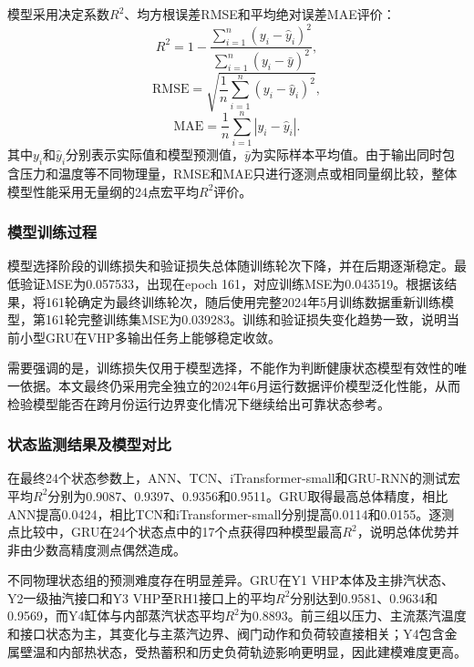 模型采用决定系数$R^2$、均方根误差RMSE和平均绝对误差MAE评价：
\begin{equation}
R^2=1-\frac{\sum_{i=1}^{n}(y_i-\hat y_i)^2}{\sum_{i=1}^{n}(y_i-\bar y)^2},
\end{equation}
\begin{equation}
\mathrm{RMSE}=\sqrt{\frac{1}{n}\sum_{i=1}^{n}(y_i-\hat y_i)^2},
\end{equation}
\begin{equation}
\mathrm{MAE}=\frac{1}{n}\sum_{i=1}^{n}|y_i-\hat y_i|.
\end{equation}
其中$y_i$和$\hat y_i$分别表示实际值和模型预测值，$\bar y$为实际样本平均值。由于输出同时包含压力和温度等不同物理量，RMSE和MAE只进行逐测点或相同量纲比较，整体模型性能采用无量纲的24点宏平均$R^2$评价。

\subsubsection{模型训练过程}

模型选择阶段的训练损失和验证损失总体随训练轮次下降，并在后期逐渐稳定。最低验证MSE为0.057533，出现在epoch 161，对应训练MSE为0.043519。根据该结果，将161轮确定为最终训练轮次，随后使用完整2024年5月训练数据重新训练模型，第161轮完整训练集MSE为0.039283。训练和验证损失变化趋势一致，说明当前小型GRU在VHP多输出任务上能够稳定收敛。

需要强调的是，训练损失仅用于模型选择，不能作为判断健康状态模型有效性的唯一依据。本文最终仍采用完全独立的2024年6月运行数据评价模型泛化性能，从而检验模型能否在跨月份运行边界变化情况下继续给出可靠状态参考。

\subsubsection{状态监测结果及模型对比}

在最终24个状态参数上，ANN、TCN、iTransformer-small和GRU-RNN的测试宏平均$R^2$分别为0.9087、0.9397、0.9356和0.9511。GRU取得最高总体精度，相比ANN提高0.0424，相比TCN和iTransformer-small分别提高0.0114和0.0155。逐测点比较中，GRU在24个状态点中的17个点获得四种模型最高$R^2$，说明总体优势并非由少数高精度测点偶然造成。

不同物理状态组的预测难度存在明显差异。GRU在Y1 VHP本体及主排汽状态、Y2一级抽汽接口和Y3 VHP至RH1接口上的平均$R^2$分别达到0.9581、0.9634和0.9569，而Y4缸体与内部蒸汽状态平均$R^2$为0.8893。前三组以压力、主流蒸汽温度和接口状态为主，其变化与主蒸汽边界、阀门动作和负荷较直接相关；Y4包含金属壁温和内部热状态，受热蓄积和历史负荷轨迹影响更明显，因此建模难度更高。

